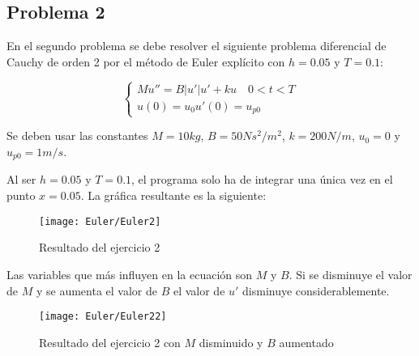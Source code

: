 \subsection{Problema 2}\label{subsec:problema-2}

En el segundo problema se debe resolver el siguiente problema diferencial de Cauchy de
orden 2 por el método de Euler explícito con \(h = 0.05\) y \(T = 0.1\):

\[
    \begin{cases}
        Mu'' = B|u'|u' + ku \quad 0 < t < T \\
        u(0) = u_0
        u'(0) = u_{p0}
    \end{cases}
\]

Se deben usar las constantes \(M = 10 kg\), \(B = 50 Ns^2/m^2\), \(k = 200 N/m\),
\(u_0 = 0\) y \(u_{p0} = 1 m/s\).

Al ser \(h = 0.05\) y \(T = 0.1\), el programa solo ha de integrar una única vez
en el punto \(x = 0.05\).
La gráfica resultante es la siguiente:

\begin{figure}[H]
    \texttt{[image: Euler/Euler2]}
    \centering
    \caption{Resultado del ejercicio 2}\label{fig:euler-2}
\end{figure}

Las variables que más influyen en la ecuación son \(M\) y \(B\).
Si se disminuye el valor de \(M\) y se aumenta el valor de \(B\)
el valor de \(u'\) disminuye considerablemente.

\begin{figure}[H]
    \texttt{[image: Euler/Euler22]}
    \centering
    \caption{Resultado del ejercicio 2 con \(M\) disminuido y \(B\) aumentado}
    \label{fig:euler-22}
\end{figure}

